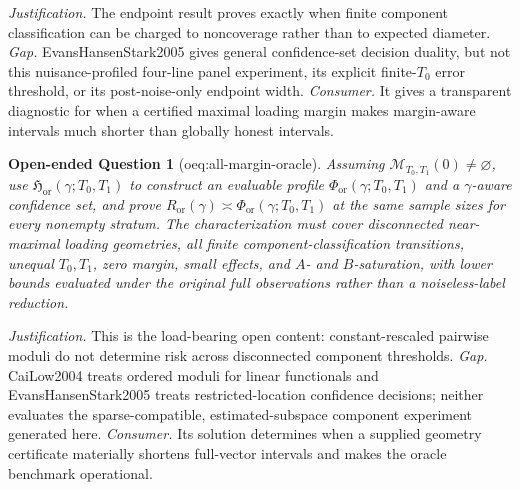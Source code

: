 \documentclass{article}
\newtheorem{openendedquestion}{Open-ended Question}
\begin{document}
\par\smallskip\noindent \textit{Justification.} The endpoint result proves exactly when finite component classification can be charged to noncoverage rather than to expected diameter. \textit{Gap.} EvansHansenStark2005 gives general confidence-set decision duality, but not this nuisance-profiled four-line panel experiment, its explicit finite-\(T_0\) error threshold, or its post-noise-only endpoint width. \textit{Consumer.} It gives a transparent diagnostic for when a certified maximal loading margin makes margin-aware intervals much shorter than globally honest intervals.

\begin{openendedquestion}[oeq:all-margin-oracle]\label{oeq:all-margin-oracle}
Assuming \(\mathcal M_{T_0,T_1}(0)\ne\varnothing\), use \(\mathfrak H_{\mathrm{or}}(\gamma;T_0,T_1)\) to construct an evaluable profile \(\Phi_{\mathrm{or}}(\gamma;T_0,T_1)\) and a \(\gamma\)-aware confidence set, and prove \(R_{\mathrm{or}}(\gamma)\asymp\Phi_{\mathrm{or}}(\gamma;T_0,T_1)\) at the same sample sizes for every nonempty stratum. The characterization must cover disconnected near-maximal loading geometries, all finite component-classification transitions, unequal \(T_0,T_1\), zero margin, small effects, and \(A\)- and \(B\)-saturation, with lower bounds evaluated under the original full observations rather than a noiseless-label reduction.
\end{openendedquestion}
\par\smallskip\noindent \textit{Justification.} This is the load-bearing open content: constant-rescaled pairwise moduli do not determine risk across disconnected component thresholds. \textit{Gap.} CaiLow2004 treats ordered moduli for linear functionals and EvansHansenStark2005 treats restricted-location confidence decisions; neither evaluates the sparse-compatible, estimated-subspace component experiment generated here. \textit{Consumer.} Its solution determines when a supplied geometry certificate materially shortens full-vector intervals and makes the oracle benchmark operational.
\end{document}

